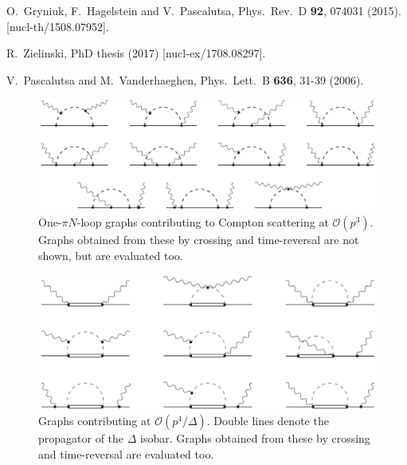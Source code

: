 \documentclass[twocolumn,prc,showpacs,nofootinbib,preprintnumbers,amsmath,amssymb,superscriptaddress]{revtex4-1}
\begin{document}
\begin{thebibliography}{99}
O.~Gryniuk, F.~Hagelstein and V.~Pascalutsa,
Phys.\ Rev.\ D {\bf 92}, 074031 (2015). [nucl-th/1508.07952].

R.~Zielinski, PhD thesis (2017) [nucl-ex/1708.08297].

V.~Pascalutsa and M.~Vanderhaeghen, Phys.\ Lett.\ B {\bf 636}, 31-39 (2006).




\end{thebibliography}



 \begin{figure}[bt]
 \centering
 \includegraphics[width=0.95\columnwidth]{Diags1_pv.pdf} 
\caption{%
One-$\pi N$-loop graphs contributing to Compton scattering at $\mathcal{O}(p^3)$. Graphs obtained from these by
crossing and time-reversal are not shown, but are evaluated too.
}
\label{Fig:loops_pv}
\end{figure}

\begin{figure}[t]
\centering
\includegraphics[width=0.95\columnwidth]{DeltaDiags4.pdf} 
\caption{%
Graphs contributing at  $\mathcal{O}(p^4/\mathit{\Delta})$. 
Double lines denote the propagator of the $\Delta$ isobar.
Graphs obtained from these by
crossing and time-reversal are evaluated too.}
\label{Fig:loopsD}
\end{figure}
\end{document}
